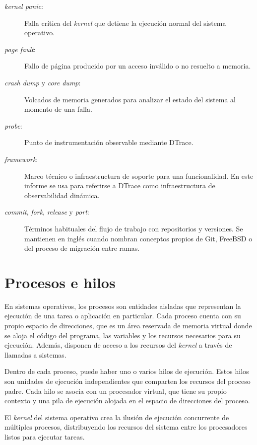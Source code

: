 \begin{description}
    \item[\textit{kernel panic}:] Falla crítica del \textit{kernel} que detiene la ejecución normal del sistema operativo.
    \item[\textit{page fault}:] Fallo de página producido por un acceso inválido o no resuelto a memoria.
    \item[\textit{crash dump} y \textit{core dump}:] Volcados de memoria generados para analizar el estado del sistema al momento de una falla.
    \item[\textit{probe}:] Punto de instrumentación observable mediante DTrace.
    \item[\textit{framework}:] Marco técnico o infraestructura de soporte para una funcionalidad. En este informe se usa para referirse a DTrace como infraestructura de observabilidad dinámica.
    \item[\textit{commit}, \textit{fork}, \textit{release} y \textit{port}:] Términos habituales del flujo de trabajo con repositorios y versiones. Se mantienen en inglés cuando nombran conceptos propios de Git, FreeBSD o del proceso de migración entre ramas.
\end{description}

\section{Procesos e hilos}

En sistemas operativos, los procesos son entidades aisladas que representan la ejecución de una tarea o aplicación en particular. Cada proceso cuenta con su propio espacio de direcciones, que es un área reservada de memoria virtual donde se aloja el código del programa, las variables y los recursos necesarios para su ejecución. Además, disponen de acceso a los recursos del \textit{kernel} a través de llamadas a sistemas.\par

Dentro de cada proceso, puede haber uno o varios hilos de ejecución. Estos hilos son unidades de ejecución independientes que comparten los recursos del proceso padre. Cada hilo se asocia con un procesador virtual, que tiene su propio contexto y una pila de ejecución alojada en el espacio de direcciones del proceso.\par

El \textit{kernel} del sistema operativo crea la ilusión de ejecución concurrente de múltiples procesos, distribuyendo los recursos del sistema entre los procesadores listos para ejecutar tareas.\par

